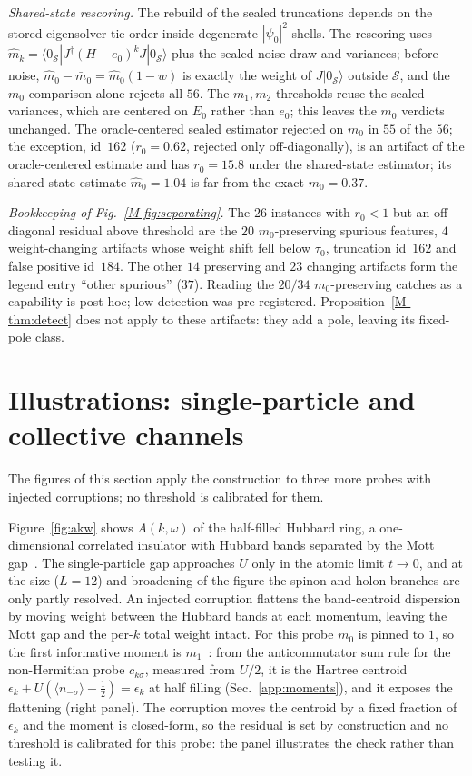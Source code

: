 \documentclass[aps,prb,onecolumn,superscriptaddress,longbibliography,floatfix]{revtex4-2}
\begin{document}
\emph{Shared-state rescoring.} The rebuild of the sealed truncations depends on the stored eigensolver tie order inside degenerate $|\psi_0|^2$ shells. The rescoring uses $\widehat m_k=\langle0_\mathcal{S}|J^\dagger(H-e_0)^kJ|0_\mathcal{S}\rangle$ plus the sealed noise draw and variances; before noise, $\widehat m_0-\bar m_0=\widehat m_0(1-w)$ is exactly the weight of $J|0_\mathcal{S}\rangle$ outside $\mathcal{S}$, and the $m_0$ comparison alone rejects all $56$. The $m_1,m_2$ thresholds reuse the sealed variances, which are centered on $E_0$ rather than $e_0$; this leaves the $m_0$ verdicts unchanged. The oracle-centered sealed estimator rejected on $m_0$ in $55$ of the $56$; the exception, id~$162$ ($r_0=0.62$, rejected only off-diagonally), is an artifact of the oracle-centered estimate and has $r_0=15.8$ under the shared-state estimator; its shared-state estimate $\widehat m_0=1.04$ is far from the exact $m_0=0.37$.

\emph{Bookkeeping of Fig.~\ref{M-fig:separating}.} The $26$ instances with $r_0<1$ but an off-diagonal residual above threshold are the $20$ $m_0$-preserving spurious features, $4$ weight-changing artifacts whose weight shift fell below $\tau_0$, truncation id~$162$ and false positive id~$184$. The other $14$ preserving and $23$ changing artifacts form the legend entry ``other spurious'' ($37$). Reading the $20/34$ $m_0$-preserving catches as a capability is post hoc; low detection was pre-registered. Proposition~\ref{M-thm:detect} does not apply to these artifacts: they add a pole, leaving its fixed-pole class.

\section{Illustrations: single-particle and collective channels}
\label{app:illustrations}
The figures of this section apply the construction to three more probes with injected corruptions; no threshold is calibrated for them.

Figure~\ref{fig:akw} shows $A(k,\omega)$ of the half-filled Hubbard ring, a one-dimensional correlated insulator with Hubbard bands separated by the Mott gap~\cite{Hubbard1963,LiebWu1968,Dagotto1994}. The single-particle gap approaches $U$ only in the atomic limit $t\to0$, and at the size ($L=12$) and broadening of the figure the spinon and holon branches are only partly resolved. An injected corruption flattens the band-centroid dispersion by moving weight between the Hubbard bands at each momentum, leaving the Mott gap and the per-$k$ total weight intact. For this probe $m_0$ is pinned to $1$, so the first informative moment is $m_1$~\cite{Lehmann1954,Freericks2009}: from the anticommutator sum rule for the non-Hermitian probe $c_{k\sigma}$, measured from $U/2$, it is the Hartree centroid $\epsilon_k+U(\langle n_{-\sigma}\rangle-\tfrac12)=\epsilon_k$ at half filling (Sec.~\ref{app:moments}), and it exposes the flattening (right panel). The corruption moves the centroid by a fixed fraction of $\epsilon_k$ and the moment is closed-form, so the residual is set by construction and no threshold is calibrated for this probe: the panel illustrates the check rather than testing it.
\end{document}
